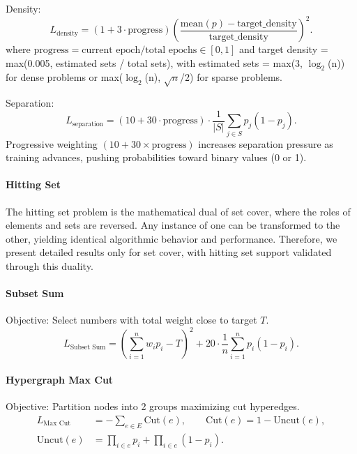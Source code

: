 \documentclass[conference]{IEEEtran}
\begin{document}
Density:
\begin{equation}
L_{\text{density}} = (1 + 3 \cdot \mathrm{progress}) \left( \frac{\mathrm{mean}(p) - \mathrm{target\_density}}{\mathrm{target\_density}} \right)^2.
\end{equation}
where \(\mathrm{progress} = \text{current epoch} / \text{total epochs} \in [0,1]\) and target density = max(0.005, estimated sets / total sets), with estimated sets = max(3, \(\log_2\)(n)) for dense problems or max(\(\log_2\)(n), \(\sqrt{n}\)/2) for sparse problems.

Separation:
\begin{equation}
L_{\text{separation}} = (10 + 30 \cdot \mathrm{progress}) \cdot \frac{1}{|S|} \sum_{j \in S} p_j(1 - p_j).
\end{equation}
Progressive weighting \((10 + 30 \times \text{progress})\) increases separation pressure as training advances, pushing probabilities toward binary values (0 or 1).

\paragraph{Hitting Set}
The hitting set problem is the mathematical dual of set cover, where the roles of elements and sets are reversed. Any instance of one can be transformed to the other, yielding identical algorithmic behavior and performance. Therefore, we present detailed results only for set cover, with hitting set support validated through this duality.

\paragraph{Subset Sum}
Objective: Select numbers with total weight close to target \(T\).
\begin{equation}
L_{\text{Subset Sum}} = \left( \sum_{i=1}^n w_i p_i - T \right)^2 + 20 \cdot \frac{1}{n} \sum_{i=1}^n p_i(1 - p_i).
\end{equation}

\paragraph{Hypergraph Max Cut}
Objective: Partition nodes into 2 groups maximizing cut hyperedges.
\begin{align}
L_{\text{Max Cut}} &= - \sum_{e \in E} \mathrm{Cut}(e), \qquad \mathrm{Cut}(e) = 1 - \mathrm{Uncut}(e), \\
\mathrm{Uncut}(e) &= \prod_{i \in e} p_i + \prod_{i \in e} (1 - p_i).
\end{align}
\end{document}
